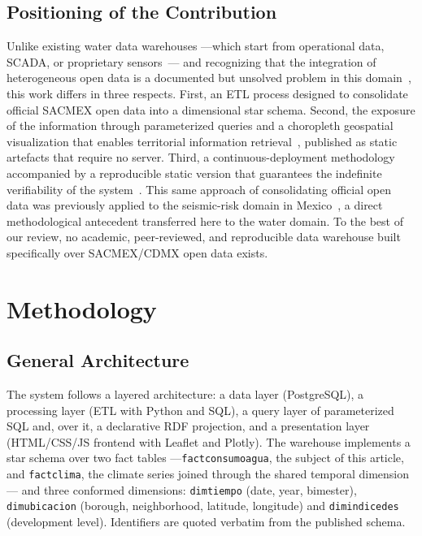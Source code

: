 \documentclass[runningheads]{llncs}
\newif\ifmarcarcambios
\newcommand{\icokg}[1]{\ifmarcarcambios\textcolor{nuevo}{#1}\else#1\fi}
\renewcommand{\_}{\origunderscore\allowbreak}
\begin{document}
\subsection{Positioning of the Contribution}

Unlike existing water data warehouses ---which start from operational data, SCADA, or proprietary sensors~\cite{soares2019,abecker2014}--- and recognizing that the integration of heterogeneous open data is a documented but unsolved problem in this domain~\cite{berro2015,vetro2016}, this work differs in three respects. First, an ETL process designed to consolidate official SACMEX open data into a dimensional star schema. Second, \icokg{the exposure of the information through parameterized queries and a choropleth geospatial visualization that enables territorial information retrieval~\cite{purves2018}, published as static artefacts that require no server}. Third, a continuous-deployment methodology accompanied by a reproducible static version that guarantees the indefinite verifiability of the system~\cite{sandve2013,hill2023}. This same approach of consolidating official open data was previously applied to the seismic-risk domain in Mexico~\cite{villa2026}, a direct methodological antecedent transferred here to the water domain. To the best of our review, no academic, peer-reviewed, and reproducible data warehouse built specifically over SACMEX/CDMX open data exists.

\section{Methodology}
\label{sec:met}

\subsection{General Architecture}

The system follows a layered architecture: a data layer (PostgreSQL), a processing layer (ETL with Python and SQL), \icokg{a query layer of parameterized SQL and, over it, a declarative RDF projection}, and a presentation layer (HTML/CSS/JS frontend with Leaflet and Plotly). The warehouse implements a star schema over \icokg{two fact tables ---\texttt{fact\_consumo\_agua}, the subject of this article, and \texttt{fact\_clima}, the climate series joined through the shared temporal dimension--- and three conformed dimensions: \texttt{dim\_tiempo} (date, year, bimester), \texttt{dim\_ubicacion} (borough, neighborhood, latitude, longitude) and \texttt{dim\_indice\_des} (development level). Identifiers are quoted verbatim from the published schema.}
\end{document}
